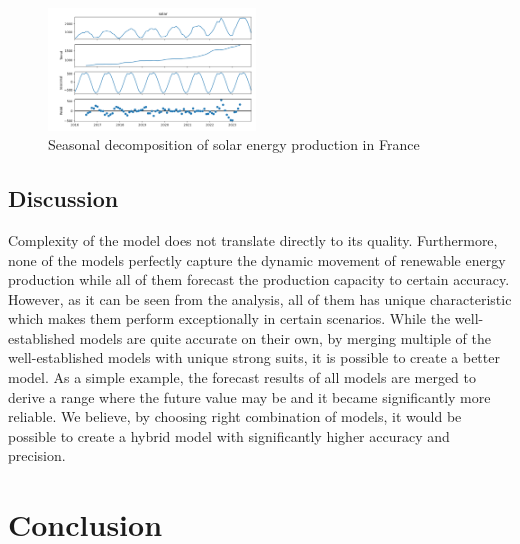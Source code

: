 \documentclass[acmtog]{acmart}
\begin{document}
\begin{figure}[htb!]
    \centering
    \includegraphics[width=0.49\textwidth]{figures/Figure_4.png}
    \caption{Seasonal decomposition of solar energy production in France}
    \label{fig:seasonal_decompose} %
\end{figure}

\subsection{Discussion}

Complexity of the model does not translate directly to its quality. Furthermore, none of the models perfectly capture the dynamic movement of renewable energy production while all of them forecast the production capacity to certain accuracy. However, as it can be seen from the analysis, all of them has unique characteristic which makes them perform exceptionally in certain scenarios. While the well-established models are quite accurate on their own, by merging multiple of the well-established models with unique strong suits, it is possible to create a better model. As a simple example, the forecast results of all models are merged to derive a range where the future value may be and it became significantly more reliable. We believe, by choosing right combination of models, it would be possible to create a hybrid model with significantly higher accuracy and precision.

\section{Conclusion}
\end{document}
